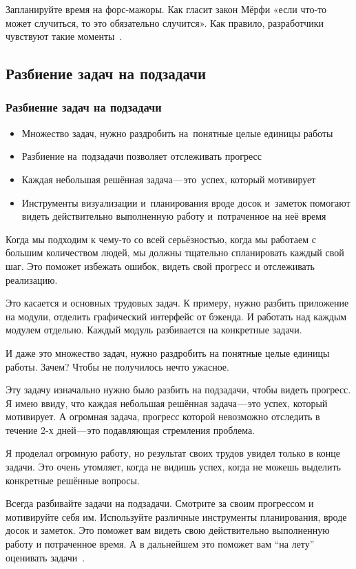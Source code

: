 \documentclass{../industrial-development}
\begin{document}
Запланируйте время на форс-мажоры. Как гласит закон Мёрфи «если что-то может случиться, то это обязательно случится». Как правило, разработчики чувствуют такие моменты~\cite{TMHabr}.

\subsection{Разбиение задач на подзадачи}

\begin{frame} \frametitle{Разбиение задач на подзадачи}
  \begin{itemize}
  \item Множество задач, нужно раздробить на~понятные целые единицы работы
  \item Разбиение на~подзадачи позволяет отслеживать прогресс
  \item Каждая небольшая решённая задача — это~успех, который мотивирует
  \item Инструменты визуализации и~планирования вроде досок и~заметок помогают видеть действительно выполненную работу и~потраченное на неё время
  \end{itemize}
\end{frame}

\lecturenotes

Когда мы подходим к чему-то со всей серьёзностью, когда мы работаем с большим количеством людей, мы должны тщательно спланировать каждый свой шаг. Это поможет избежать ошибок, видеть свой прогресс и отслеживать реализацию.

Это касается и основных трудовых задач. К примеру, нужно разбить приложение на модули, отделить графический интерфейс от бэкенда. И работать над каждым модулем отдельно.
Каждый модуль разбивается на конкретные задачи.

И даже это множество задач, нужно раздробить на понятные целые единицы работы. Зачем? Чтобы не получилось нечто ужасное.

Эту задачу изначально нужно было разбить на подзадачи, чтобы видеть прогресс. Я имею ввиду, что каждая небольшая решённая задача — это успех, который мотивирует. А огромная задача, прогресс которой невозможно отследить в течение 2-х дней — это подавляющая стремления проблема.

Я проделал огромную работу, но результат своих трудов увидел только в конце задачи. Это очень утомляет, когда не видишь успех, когда не можешь выделить конкретные решённые вопросы.

Всегда разбивайте задачи на подзадачи. Смотрите за своим прогрессом и мотивируйте себя им. Используйте различные инструменты планирования, вроде досок и заметок. Это поможет вам видеть свою действительно выполненную работу и потраченное время. А в дальнейшем это поможет вам “на лету” оценивать задачи~\cite{TasksMedium}.
\end{document}
